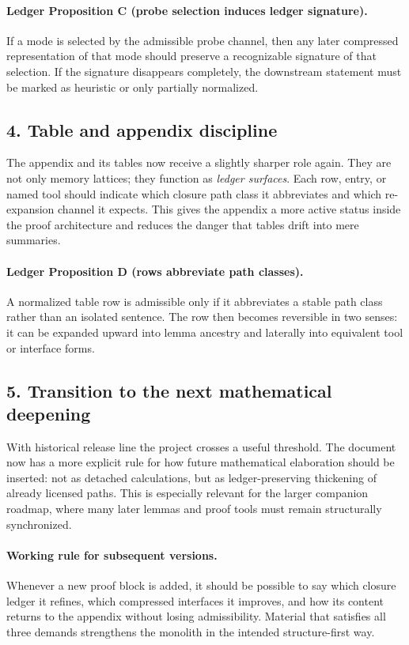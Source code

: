 \documentclass[12pt,a4paper]{article}
\DeclareRobustCommand{\QSCver}[1]{archival stage}
\renewcommand{\QSCver}[1]{historical release line}
\begin{document}
\paragraph{Ledger Proposition C (probe selection induces ledger signature).}
If a mode is selected by the admissible probe channel, then any later compressed
representation of that mode should preserve a recognizable signature of that
selection. If the signature disappears completely, the downstream statement must
be marked as heuristic or only partially normalized.

\subsection*{4. Table and appendix discipline}
The appendix and its tables now receive a slightly sharper role again. They are
not only memory lattices; they function as \emph{ledger surfaces}. Each row,
entry, or named tool should indicate which closure path class it abbreviates and
which re-expansion channel it expects. This gives the appendix a more active
status inside the proof architecture and reduces the danger that tables drift
into mere summaries.

\paragraph{Ledger Proposition D (rows abbreviate path classes).}
A normalized table row is admissible only if it abbreviates a stable path class
rather than an isolated sentence. The row then becomes reversible in two senses:
it can be expanded upward into lemma ancestry and laterally into equivalent tool
or interface forms.

\subsection*{5. Transition to the next mathematical deepening}
With \QSCver{v2.0.0} the project crosses a useful threshold. The document now has a
more explicit rule for how future mathematical elaboration should be inserted:
not as detached calculations, but as ledger-preserving thickening of already
licensed paths. This is especially relevant for the larger companion roadmap,
where many later lemmas and proof tools must remain structurally synchronized.

\paragraph{Working rule for subsequent versions.}
Whenever a new proof block is added, it should be possible to say which closure
ledger it refines, which compressed interfaces it improves, and how its content
returns to the appendix without losing admissibility. Material that satisfies
all three demands strengthens the monolith in the intended structure-first way.
\end{document}
